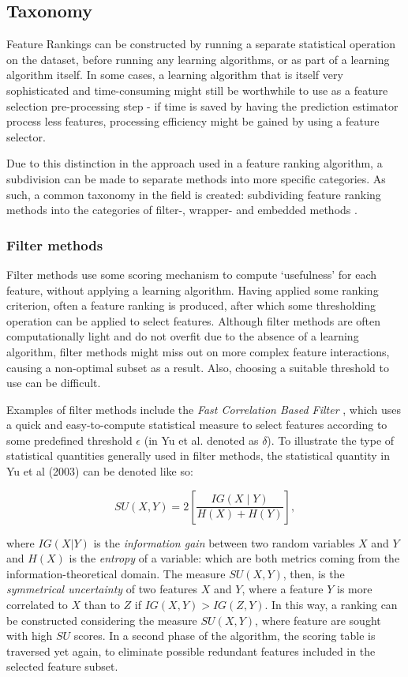 \documentclass{article}
\begin{document}
\subsection{Taxonomy}
Feature Rankings can be constructed by running a separate statistical operation on the dataset, before running any learning algorithms, or as part of a learning algorithm itself. In some cases, a learning algorithm that is itself very sophisticated and time-consuming might still be worthwhile to use as a feature selection pre-processing step - if time is saved by having the prediction estimator process less features, processing efficiency might be gained by using a feature selector.

Due to this distinction in the approach used in a feature ranking algorithm, a subdivision can be made to separate methods into more specific categories. As such, a common taxonomy in the field is created: subdividing feature ranking methods into the categories of filter-, wrapper- and embedded methods \citep{chandrashekar_survey_2014}.

\subsubsection{Filter methods}
Filter methods use some scoring mechanism to compute \lq usefulness' for each feature, without applying a learning algorithm. Having applied some ranking criterion, often a feature ranking is produced, after which some thresholding operation can be applied to select features. Although filter methods are often computationally light and do not overfit due to the absence of a learning algorithm, filter methods might miss out on more complex feature interactions, causing a non-optimal subset as a result. Also, choosing a suitable threshold to use can be difficult.

Examples of filter methods include the \textit{Fast Correlation Based Filter} \citep{yu_feature_2003}, which uses a quick and easy-to-compute statistical measure to select features according to some predefined threshold $\epsilon$ (in Yu et al. denoted as $\delta$). To illustrate the type of statistical quantities generally used in filter methods, the statistical quantity in Yu et al (2003) can be denoted like so:

\begin{equation}
S U(X, Y)=2\left[\frac{I G(X \mid Y)}{H(X)+H(Y)}\right],
\end{equation}

where $I G(X|Y)$ is the \textit{information gain} between two random variables $X$ and $Y$ and $H(X)$ is the \textit{entropy} of a variable: which are both metrics coming from the information-theoretical domain. The measure $SU(X, Y)$, then, is the \textit{symmetrical uncertainty} of two features $X$ and $Y$, where a feature $Y$ is more correlated to $X$ than to $Z$ if $IG(X, Y) > IG(Z, Y)$. In this way, a ranking can be constructed considering the measure $SU(X, Y)$, where feature are sought with high $SU$ scores. In a second phase of the algorithm, the scoring table is traversed yet again, to eliminate possible redundant features included in the selected feature subset.
\end{document}

